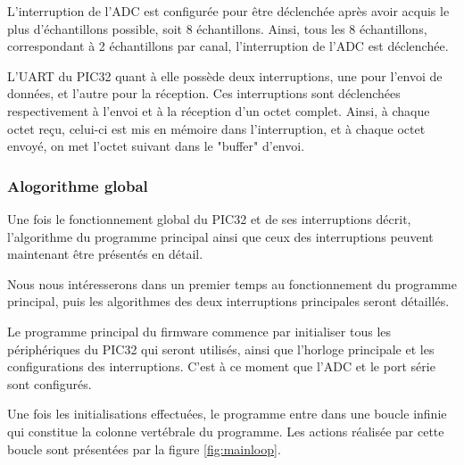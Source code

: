 \documentclass[letterpaper, twoside, 12pt, memoire, creativecommons, hyperref]{thETS}
\begin{document}
L'interruption de l'ADC est configurée pour être déclenchée après avoir acquis le plus d'échantillons possible, soit 8 échantillons. Ainsi, tous les 8 échantillons, correspondant à 2 échantillons par canal, l'interruption de l'ADC est déclenchée. 

L'UART du PIC32 quant à elle possède deux interruptions, une pour l'envoi de données, et l'autre pour la réception. Ces interruptions sont déclenchées respectivement à l'envoi et à la réception d'un octet complet. Ainsi, à chaque octet reçu, celui-ci est mis en mémoire dans l'interruption, et à chaque octet envoyé, on met l'octet suivant dans le "buffer" d'envoi.

\subsubsection{Alogorithme global}

Une fois le fonctionnement global du PIC32 et de ses interruptions décrit, l'algorithme du programme principal ainsi que ceux des interruptions peuvent maintenant être présentés en détail. 

Nous nous intéresserons dans un premier temps au fonctionnement du programme principal, puis les algorithmes des deux interruptions principales seront détaillés. 

Le programme principal du firmware commence par initialiser tous les périphériques du PIC32 qui seront utilisés, ainsi que l'horloge principale et les configurations des interruptions. C'est à ce moment que l'ADC et le port série sont configurés. 

Une fois les initialisations effectuées, le programme entre dans une boucle infinie qui constitue la colonne vertébrale du programme. Les actions réalisée par cette boucle sont présentées par la figure \ref{fig:mainloop}.
\end{document}
